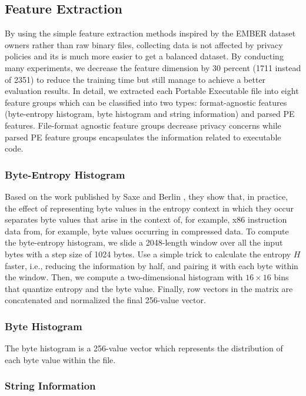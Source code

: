 \documentclass[runningheads]{llncs}
\begin{document}
\subsection{Feature Extraction}

By using the simple feature extraction methods inspired by the EMBER dataset owners rather than raw binary files, collecting data is not affected by privacy policies and its is much more easier to get a balanced dataset. By conducting many experiments, we decrease the feature dimension by 30 percent (1711 instead of 2351) to reduce the training time but still manage to achieve a better evaluation results. In detail, we extracted each Portable Executable file into eight feature groups which can be classified into two types: format-agnostic features (byte-entropy histogram, byte histogram and string information) and parsed PE features. File-format agnostic feature groups decrease privacy concerns while parsed PE feature groups encapsulates the information related to executable code.

\subsubsection{Byte-Entropy Histogram}

Based on the work published by Saxe and Berlin \cite{saxe2015deep}, they show that, in practice, the effect of representing byte values in the entropy context in which they occur separates byte values that arise in the context of, for example, x86 instruction data from, for example, byte values occurring in compressed data. To compute the byte-entropy histogram, we slide a 2048-length window over all the input bytes with a step size of 1024 bytes. Use a simple trick to calculate the entropy $H$ faster, i.e., reducing the information by half, and pairing it with each byte within the window. Then, we compute a two-dimensional histogram with $16 \times 16$ bins that quantize entropy and the byte value. Finally, row vectors in the matrix are concatenated and normalized the final 256-value vector.

\subsubsection{Byte Histogram}

The byte histogram is a 256-value vector which represents the distribution of each byte value within the file.

\subsubsection{String Information}
\end{document}
